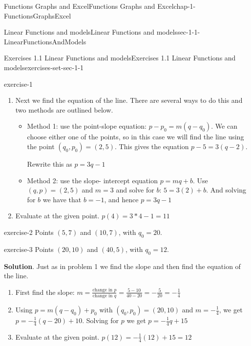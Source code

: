 \documentclass[oneside,10pt,]{book}
\numberwithin{equation}{section}
\begin{document}
\begin{chapterptx}{Functions Graphs and Excel}{}{Functions Graphs and Excel}{}{}{chap-1-FunctionsGraphsExcel}
\begin{sectionptx}{Linear Functions and models}{}{Linear Functions and models}{}{}{sec-1-1-LinearFunctionsAndModels}
\begin{exercises-subsection-numberless}{Exercises 1.1 Linear Functions and models}{}{Exercises 1.1 Linear Functions and models}{}{}{exercises-set-sec-1-1}
\begin{exercisegroup}
\begin{divisionexerciseeg}{1}{}{}{exercise-1}
\begin{enumerate}[label=(\alph*)]
First find the slope: \(m=  \frac{\text{change in }p}{\text{change in }q}
=  \frac{17-5}{6-2}=\frac{12}{4}=3\)%
\item\hypertarget{li-26}{}\hypertarget{p-73}{}%
Next we find the equation of the line. There are several ways to do this and two methods are outlined below.%
%
\begin{itemize}[label=\textbullet]
\item{}\hypertarget{p-74}{}%
Method 1: use the point-slope equation: \(p-p_0=m (q-q_0)\). We can choose either one of the points, so in this case we will find the line using the point \((q_0,p_0 )=(2,5)\). This gives the equation \(p-5=3 (q-2)\).%
\par
\hypertarget{p-75}{}%
Rewrite this as \(p=3q-1\)%
\item{}\hypertarget{p-76}{}%
Method 2: use the slope- intercept equation \(p=m q+b\). Use \((q,p)=(2,5)\) and \(m = 3\) and solve for \(b\): \(5=3 (2)+b\). And solving for \(b\) we have that \(b= -1\), and hence \(p=3q-1\)%
\end{itemize}
\item\hypertarget{li-29}{}\hypertarget{p-77}{}%
Evaluate at the given point.  \(p(4)=3*4-1=11\)%
\end{enumerate}
\end{divisionexerciseeg}%
\begin{divisionexerciseeg}{2}{}{}{exercise-2}%
\hypertarget{p-78}{}%
Points \((5,7)\) and \((10,7)\), with \(q_0=20\).%
\end{divisionexerciseeg}%
\begin{divisionexerciseeg}{3}{}{}{exercise-3}%
\hypertarget{p-79}{}%
Points \((20,10)\) and \((40,5)\), with \(q_0=12\).%
\par\smallskip%
\noindent\textbf{Solution}.\hypertarget{solution-2}{}\quad%
\hypertarget{p-80}{}%
Just as in problem 1 we find the slope and then find the equation of the line.%
\leavevmode%
\begin{enumerate}[label=(\alph*)]
\item\hypertarget{li-30}{}\hypertarget{p-81}{}%
First find the slope: \(m=  \frac{\text{change in }p}{\text{change in }q}
=  \frac{5-10}{40-20}=-\frac{5}{20}=-\frac{1}{4}\)%
\item\hypertarget{li-31}{}\hypertarget{p-82}{}%
Using \(p=m (q-q_0)+p_0\) with \((q_0,p_0 )=(20, 10)\) and \(m = -\frac{1}{4}\), we get \(p=-\frac{1}{4}(q-20)+10\).  Solving for \(p\) we get \(p =-\frac{1}{4}q+15\)%
\item\hypertarget{li-32}{}\hypertarget{p-83}{}%
Evaluate at the given point.  \(p(12)=-\frac{1}{4}(12)+15=12\)%

\end{enumerate}
\end{divisionexerciseeg}
\end{exercisegroup}
\end{exercises-subsection-numberless}
\end{sectionptx}
\end{chapterptx}
\end{document}
